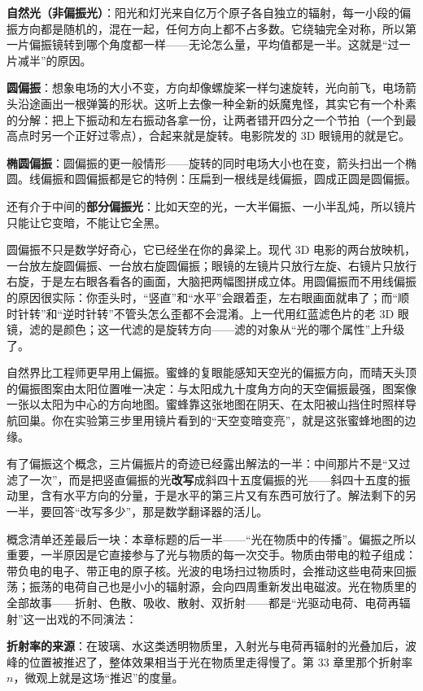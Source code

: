 \textbf{自然光（非偏振光）}：阳光和灯光来自亿万个原子各自独立的辐射，每一小段的偏振方向都是随机的，混在一起，任何方向上都不占多数。它绕轴完全对称，所以第一片偏振镜转到哪个角度都一样——无论怎么量，平均值都是一半。这就是“过一片减半”的原因。

\textbf{圆偏振}：想象电场的大小不变，方向却像螺旋桨一样匀速旋转，光向前飞，电场箭头沿途画出一根弹簧的形状。这听上去像一种全新的妖魔鬼怪，其实它有一个朴素的分解：把上下振动和左右振动各拿一份，让两者错开四分之一个节拍（一个到最高点时另一个正好过零点），合起来就是旋转。电影院发的 3D 眼镜用的就是它。

\textbf{椭圆偏振}：圆偏振的更一般情形——旋转的同时电场大小也在变，箭头扫出一个椭圆。线偏振和圆偏振都是它的特例：压扁到一根线是线偏振，圆成正圆是圆偏振。

还有介于中间的\textbf{部分偏振光}：比如天空的光，一大半偏振、一小半乱炖，所以镜片只能让它变暗，不能让它全黑。

圆偏振不只是数学好奇心，它已经坐在你的鼻梁上。现代 3D 电影的两台放映机，一台放左旋圆偏振、一台放右旋圆偏振；眼镜的左镜片只放行左旋、右镜片只放行右旋，于是左右眼各看各的画面，大脑把两幅图拼成立体。用圆偏振而不用线偏振的原因很实际：你歪头时，“竖直”和“水平”会跟着歪，左右眼画面就串了；而“顺时针转”和“逆时针转”不管头怎么歪都不会混淆。上一代用红蓝滤色片的老 3D 眼镜，滤的是颜色；这一代滤的是旋转方向——滤的对象从“光的哪个属性”上升级了。

自然界比工程师更早用上偏振。蜜蜂的复眼能感知天空光的偏振方向，而晴天头顶的偏振图案由太阳位置唯一决定：与太阳成九十度角方向的天空偏振最强，图案像一张以太阳为中心的方向地图。蜜蜂靠这张地图在阴天、在太阳被山挡住时照样导航回巢。你在实验第三步里用镜片看到的“天空变暗变亮”，就是这张蜜蜂地图的边缘。

有了偏振这个概念，三片偏振片的奇迹已经露出解法的一半：中间那片不是“又过滤了一次”，而是把竖直偏振的光\textbf{改写}成斜四十五度偏振的光——斜四十五度的振动里，含有水平方向的分量，于是水平的第三片又有东西可放行了。解法剩下的另一半，要回答“改写多少”，那是数学翻译器的活儿。

概念清单还差最后一块：本章标题的后一半——“光在物质中的传播”。偏振之所以重要，一半原因是它直接参与了光与物质的每一次交手。物质由带电的粒子组成：带负电的电子、带正电的原子核。光波的电场扫过物质时，会推动这些电荷来回振荡；振荡的电荷自己也是小小的辐射源，会向四周重新发出电磁波。光在物质里的全部故事——折射、色散、吸收、散射、双折射——都是“光驱动电荷、电荷再辐射”这一出戏的不同演法：

\textbf{折射率的来源}：在玻璃、水这类透明物质里，入射光与电荷再辐射的光叠加后，波峰的位置被推迟了，整体效果相当于光在物质里走得慢了。第 33 章里那个折射率 \(n\)，微观上就是这场“推迟”的度量。

